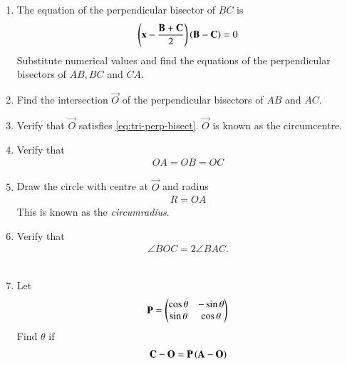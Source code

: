 \begin{enumerate}[label=\thesection.\arabic*.,ref=\thesection.\theenumi]
\item The equation of the perpendicular bisector of $BC$ is
		\begin{align}
			\label{eq:tri-perp-bisect}
			\left(\mathbf{x}-\frac{\mathbf{B}+\mathbf{C}}{2}\right)\left(\mathbf{B}-\mathbf{C}\right) = 0
		\end{align}
		Substitute numerical values and find the equations of the perpendicular bisectors of $AB, BC$ and $CA$.
	\item Find the intersection $\vec{O}$ of the perpendicular bisectors of $AB$ and $AC$.
	\item Verify that $\vec{O}$ satisfies
			\eqref{eq:tri-perp-bisect}.
$\vec{O}$ is known as the circumcentre.\\
   
		\item Verify that 
		\begin{align}
			OA = OB = OC 
		\end{align}
	\item Draw the circle with centre at $\vec{O}$ and radius 
		\begin{align}
			R = OA
		\end{align}
		This is known as the {\em circumradius}. 
	\item Verify that 
		\begin{align}
			\angle BOC = 2\angle BAC.
		\end{align}\\
  
	\item Let 
		\begin{align}
			\mathbf{P} = \begin{pmatrix}\cos \theta & -\sin \theta \\ \sin \theta & \cos \theta\end{pmatrix}
		\end{align}
		Find $\theta$ if 
		\begin{align}
			\mathbf{C}-\mathbf{O}=\mathbf{P}\left(\mathbf{A}-\mathbf{O}\right)
		\end{align}
\end{enumerate}
